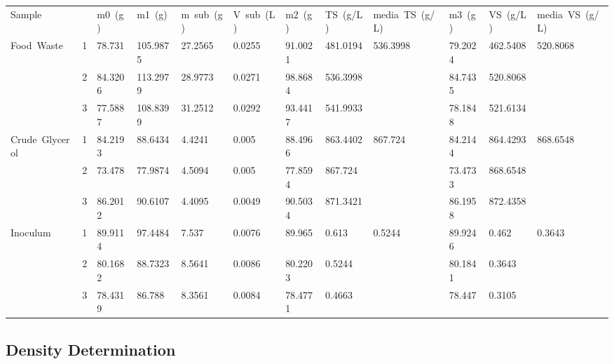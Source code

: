\documentclass[12pt, a4paper, oneside]{report}
\begin{document}
\begin{tabular}{llllllllllll}
        \mbox{Sample} & \mbox{} & \mbox{m0 (g)} & \mbox{m1 (g)} & \mbox{m sub (g)} & \mbox{V sub (L)} & \mbox{m2 (g)} & \mbox{TS (g/L)} & \mbox{media TS (g/L)} & \mbox{m3 (g)} & \mbox{VS (g/L)} & \mbox{media VS (g/L)} \\
\mbox{Food Waste} & \mbox{1} & \mbox{78.731} & \mbox{105.9875} & \mbox{27.2565} & \mbox{0.0255} & \mbox{91.0021} & \mbox{481.0194} & \mbox{536.3998} & \mbox{79.2024} & \mbox{462.5408} & \mbox{520.8068} \\
\mbox{} & \mbox{2} & \mbox{84.3206} & \mbox{113.2979} & \mbox{28.9773} & \mbox{0.0271} & \mbox{98.8684} & \mbox{536.3998} & \mbox{} & \mbox{84.7435} & \mbox{520.8068} & \mbox{} \\
\mbox{} & \mbox{3} & \mbox{77.5887} & \mbox{108.8399} & \mbox{31.2512} & \mbox{0.0292} & \mbox{93.4417} & \mbox{541.9933} & \mbox{} & \mbox{78.1848} & \mbox{521.6134} & \mbox{} \\
\mbox{Crude Glycerol} & \mbox{1} & \mbox{84.2193} & \mbox{88.6434} & \mbox{4.4241} & \mbox{0.005} & \mbox{88.4966} & \mbox{863.4402} & \mbox{867.724} & \mbox{84.2144} & \mbox{864.4293} & \mbox{868.6548} \\
\mbox{} & \mbox{2} & \mbox{73.478} & \mbox{77.9874} & \mbox{4.5094} & \mbox{0.005} & \mbox{77.8594} & \mbox{867.724} & \mbox{} & \mbox{73.4733} & \mbox{868.6548} & \mbox{} \\
\mbox{} & \mbox{3} & \mbox{86.2012} & \mbox{90.6107} & \mbox{4.4095} & \mbox{0.0049} & \mbox{90.5034} & \mbox{871.3421} & \mbox{} & \mbox{86.1958} & \mbox{872.4358} & \mbox{} \\
\mbox{Inoculum} & \mbox{1} & \mbox{89.9114} & \mbox{97.4484} & \mbox{7.537} & \mbox{0.0076} & \mbox{89.965} & \mbox{0.613} & \mbox{0.5244} & \mbox{89.9246} & \mbox{0.462} & \mbox{0.3643} \\
\mbox{} & \mbox{2} & \mbox{80.1682} & \mbox{88.7323} & \mbox{8.5641} & \mbox{0.0086} & \mbox{80.2203} & \mbox{0.5244} & \mbox{} & \mbox{80.1841} & \mbox{0.3643} & \mbox{} \\
\mbox{} & \mbox{3} & \mbox{78.4319} & \mbox{86.788} & \mbox{8.3561} & \mbox{0.0084} & \mbox{78.4771} & \mbox{0.4663} & \mbox{} & \mbox{78.447} & \mbox{0.3105} & \mbox{} \\

        \end{tabular}
    

\endgroup

\subsection{Density Determination}
\end{document}
